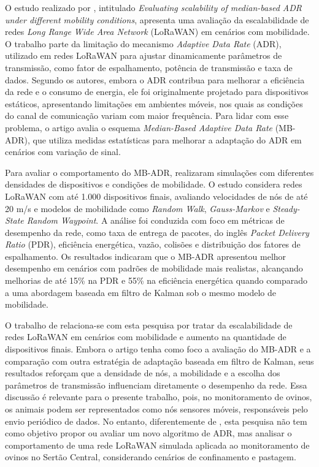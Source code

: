 O estudo realizado por , intitulado \textit{Evaluating scalability of median-based ADR under different mobility conditions}, apresenta uma avaliação da escalabilidade de redes \textit{Long Range Wide Area Network} (LoRaWAN) em cenários com mobilidade. O trabalho parte da limitação do mecanismo \textit{Adaptive Data Rate} (ADR), utilizado em redes LoRaWAN para ajustar dinamicamente parâmetros de transmissão, como fator de espalhamento, potência de transmissão e taxa de dados. Segundo os autores, embora o ADR contribua para melhorar a eficiência da rede e o consumo de energia, ele foi originalmente projetado para dispositivos estáticos, apresentando limitações em ambientes móveis, nos quais as condições do canal de comunicação variam com maior frequência. Para lidar com esse problema, o artigo avalia o esquema \textit{Median-Based Adaptive Data Rate} (MB-ADR), que utiliza medidas estatísticas para melhorar a adaptação do ADR em cenários com variação de sinal.

Para avaliar o comportamento do MB-ADR,  realizaram simulações com diferentes densidades de dispositivos e condições de mobilidade. O estudo considera redes LoRaWAN com até 1.000 dispositivos finais, avaliando velocidades de nós de até 20 m/s e modelos de mobilidade como \textit{Random Walk}, \textit{Gauss-Markov} e \textit{Steady-State Random Waypoint}. A análise foi conduzida com foco em métricas de desempenho da rede, como taxa de entrega de pacotes, do inglês \textit{Packet Delivery Ratio} (PDR), eficiência energética, vazão, colisões e distribuição dos fatores de espalhamento. Os resultados indicaram que o MB-ADR apresentou melhor desempenho em cenários com padrões de mobilidade mais realistas, alcançando melhorias de até 15\% na PDR e 55\% na eficiência energética quando comparado a uma abordagem baseada em filtro de Kalman sob o mesmo modelo de mobilidade.

O trabalho de  relaciona-se com esta pesquisa por tratar da escalabilidade de redes LoRaWAN em cenários com mobilidade e aumento na quantidade de dispositivos finais. Embora o artigo tenha como foco a avaliação do MB-ADR e a comparação com outra estratégia de adaptação baseada em filtro de Kalman, seus resultados reforçam que a densidade de nós, a mobilidade e a escolha dos parâmetros de transmissão influenciam diretamente o desempenho da rede. Essa discussão é relevante para o presente trabalho, pois, no monitoramento de ovinos, os animais podem ser representados como nós sensores móveis, responsáveis pelo envio periódico de dados. No entanto, diferentemente de , esta pesquisa não tem como objetivo propor ou avaliar um novo algoritmo de ADR, mas analisar o comportamento de uma rede LoRaWAN simulada aplicada ao monitoramento de ovinos no Sertão Central, considerando cenários de confinamento e pastagem.

